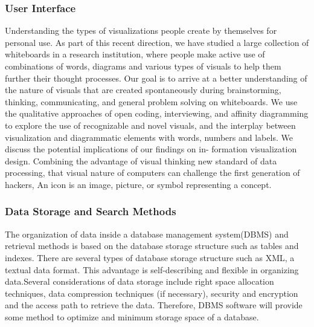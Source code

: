 	
\subsubsection*{User Interface}
Understanding the types of visualizations people create by themselves for personal use. As part of this recent direction, we have studied a large collection of whiteboards in a research institution, where people make active use of combinations of words, diagrams and various types of visuals to help them further their thought processes. Our goal is to arrive at a better understanding of the nature of visuals that are created spontaneously during brainstorming, thinking, communicating, and general problem solving on whiteboards.\cite{Blascheck2016} We use the qualitative approaches of open coding, interviewing, and affinity diagramming to explore the use of recognizable and novel visuals, and the interplay between visualization and diagrammatic elements with words, numbers and labels. We discuss the potential implications of our findings on in- formation visualization design. Combining the advantage of visual thinking new standard of data processing, that visual nature of computers can challenge the first generation of hackers, An icon is an image, picture, or symbol representing a concept.\cite{Szpunar2010}
	
	
\subsubsection*{Data Storage and Search Methods}
The organization of data inside a database management system(DBMS) and retrieval methods is based on the database storage structure such as tables and indexes. There are several types of database storage structure such as XML, a textual data format. This advantage is self-describing and flexible in organizing data.\cite{ISI:000253400700005}Several considerations of data storage include right space allocation techniques, data compression techniques (if necessary), security and encryption and the access path to retrieve the data. Therefore, DBMS software will provide some method to optimize and minimum storage space of a database.
	
\clearpage
